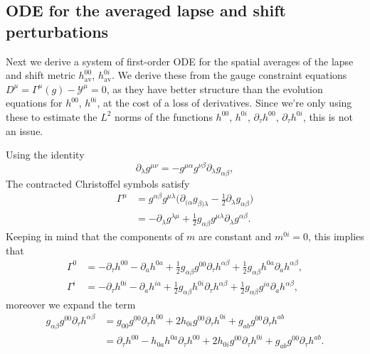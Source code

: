 \documentclass{article}
\newcommand{\av}{\mathrm{av}}
\newcommand{\mc}{\mathcal}
\newcommand{\pa}{\partial}
\begin{document}
\subsection{ODE for the averaged lapse and shift perturbations}
Next we derive a system of first-order ODE for the spatial averages of the lapse and shift metric $h_{\av}^{00}$, $h_{\av}^{0i}$. We derive these from the gauge constraint equations $D^\mu = \Gamma^\mu(g) - \mc{Y}^\mu = 0$, as they have better structure than the evolution equations for $h^{00}$, $h^{0i}$, at the cost of a loss of derivatives. Since we're only using these to estimate the $L^2$ norms of the functions $h^{00}$, $h^{0i}$, $\pa_\tau  h^{00}$, $\pa_\tau h^{0i}$, this is not an issue.

Using the identity
\begin{equation}
    \pa_\lambda g^{\mu\nu} = -g^{\mu\alpha}g^{\nu\beta}\pa_\lambda g_{\alpha\beta},
\end{equation}
The contracted Christoffel symbols satisfy
\begin{align}
    \Gamma^\mu &= g^{\alpha\beta}g^{\mu\lambda}\big(\pa_{(\alpha}g_{\beta)\lambda} - \frac{1}{2}\pa_\lambda g_{\alpha\beta}\big)\nonumber\\
    &= - \pa_\lambda g^{\lambda\mu} + \frac{1}{2}g_{\alpha\beta}g^{\mu\lambda}\pa_\lambda g^{\alpha\beta}.
\end{align}
Keeping in mind that the components of $m$ are constant and $m^{0i} = 0$, this implies that
\begin{subequations}
    \begin{align}
        \Gamma^0 &= -\pa_\tau  h^{00} - \pa_a  h^{0a} + \frac{1}{2}g_{\alpha\beta}g^{00}\pa_\tau  h^{\alpha\beta} + \frac{1}{2}g_{\alpha\beta} h^{0a}\pa_a  h^{\alpha\beta},\\
        \Gamma^i &= -\pa_\tau  h^{0i} - \pa_a  h^{ia} + \frac{1}{2}g_{\alpha\beta} h^{0i}\pa_\tau  h^{\alpha\beta} + \frac{1}{2}g_{\alpha\beta}g^{ia}\pa_a  h^{\alpha\beta},
    \end{align}
\end{subequations}
moreover we expand the term
\begin{align}
    g_{\alpha\beta}g^{00}\pa_\tau  h^{\alpha\beta} &= g_{00}g^{00}\pa_\tau  h^{00} + 2 h_{0i}g^{00}\pa_\tau  h^{0i} + g_{ab}g^{00}\pa_\tau  h^{ab}\nonumber\\
    &= \pa_\tau  h^{00} -  h_{0a} h^{0a}\pa_\tau h^{00} + 2 h_{0i}g^{00}\pa_\tau  h^{0i} + g_{ab}g^{00}\pa_\tau  h^{ab}.
\end{align}
\end{document}
